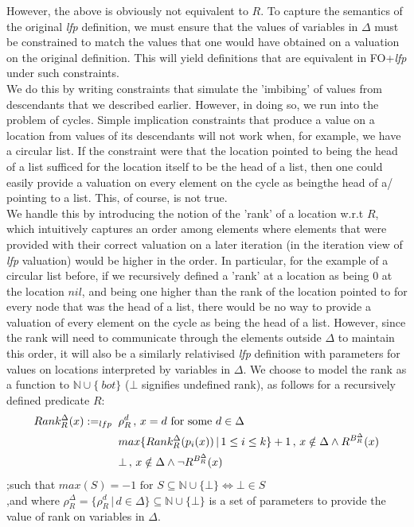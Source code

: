 \documentclass[12pt]{article} %
\begin{document}
However, the above is obviously not equivalent to $R$. To capture the semantics of the original \textit{lfp} definition, we must ensure that the values of variables in $\Delta{}$ must be constrained to match the values that one would have obtained on a valuation on the original definition. This will yield definitions that are equivalent in FO+\textit{lfp} under such constraints.\\
We do this by writing constraints that simulate the 'imbibing' of values from descendants that we described earlier. However, in doing so, we run into the problem of cycles. Simple implication constraints that produce a value on a location from values of its descendants will not work when, for example, we have a circular list. If the constraint were that the location pointed to being the head of a list sufficed for the location itself to be the head of a list, then one could easily provide a valuation on every element on the cycle as beingthe head of a/ pointing to a list. This, of course, is not true.\\
We handle this by introducing the notion of the 'rank' of a location w.r.t $R$, which intuitively captures an order among elements where elements that were provided with their correct valuation on a later iteration (in the iteration view of \textit{lfp} valuation) would be higher in the order. In particular, for the example of a circular list before, if we recursively defined a 'rank' at a location as being $0$ at the location $nil$, and being one higher than the rank of the location pointed to for every node that was the head of a list, there would be no way to provide a valuation of every element on the cycle as being the head of a list. However, since the rank will need to communicate through the elements outside $\Delta{}$ to maintain this order, it will also be a similarly relativised \textit{lfp} definition with parameters for values on locations interpreted by variables in $\Delta{}$. We choose to model the rank as a function to $\mathbb{N} \cup{} \{\ bot{}\}$ ($\bot{}$ signifies undefined rank), as follows for a recursively defined predicate $R$:\\

\begin{align}
Rank_{R}^{\Delta}(x) :=_{lfp} &\;\; \rho_{R}^{d}\,,\, x = d \textrm{ for some } d \in{}\Delta{}\notag{}\\
&\;\; max\{Rank_{R}^{\Delta}(p_i(x)) \,|\, 1 \leq{} i \leq{} k\} + 1\,,\, x \notin{} \Delta{} \land{} R^{B_{R}^{\Delta}}(x) \notag{}\\
&\;\; \bot{} \,,\, x \notin{} \Delta{} \land{} \neg{}R^{B_{R}^{\Delta}}(x)\notag{}
\end{align}
;such that $max(S) = -1 \textrm{ for } S \subseteq{} \mathbb{N} \cup{} \{\bot{}\} \iff{} \bot{} \in{} S $\\
,and where $\rho_{R}^{\Delta} = \{\rho_{R}^{d} \,|\, d \in{} \Delta{} \} \subseteq{} \mathbb{N} \cup{} \{\bot{}\}$ is a set of parameters to provide the value of rank on variables in $\Delta$.\\\
\end{document}
